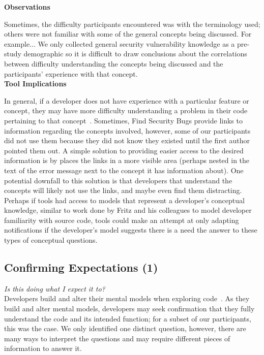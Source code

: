 \documentclass[conference]{IEEEtran}
\begin{document}
\noindent\textbf{Observations}


Sometimes, the difficulty participants encountered was with the terminology used; others were not familiar with some of the general concepts being discussed. For example...
We only collected general security vulnerability knowledge as a pre-study demographic so it is difficult to draw conclusions about the correlations between difficulty understanding the concepts being discussed and the participants' experience with that concept.
\\

\noindent\textbf{Tool Implications}

In general, if a developer does not have experience with a particular feature or concept, they may have more difficulty understanding a problem in their code pertaining to that concept~\cite{wiedenbeck1993mental}.
Sometimes, Find Security Bugs provide links to information regarding the concepts involved, however, some of our participants did not use them because they did not know they existed until the first author pointed them out. 
A simple solution to providing easier access to the desired information is by places the links in a  more visible area (perhaps nested in the text of the error message next to the concept it has information about). 
One potential downfall to this solution is that developers that understand the concepts will likely not use the links, and maybe even find them distracting.   
Perhaps if tools had access to models that represent a developer's conceptual knowledge, similar to work done by Fritz and his colleagues to model developer familiarity with source code, tools could make an attempt at only adapting notifications if the developer's model suggests there is a need the answer to these types of conceptual questions.



\noindent\subsection{\textbf{Confirming Expectations (1)}}\label{ce}

\noindent\emph{Is this doing what I expect it to?} \\
Developers build and alter their mental models when exploring code~\cite{canas1994mental, burkhardt1997mental}. 
As they build and alter mental models, developers may seek confirmation that they fully understand the code and its intended function; for a subset of our participants, this was the case. 
We only identified one distinct question, however, there are many ways to interpret the questions and may require different pieces of information to answer it.
\end{document}
